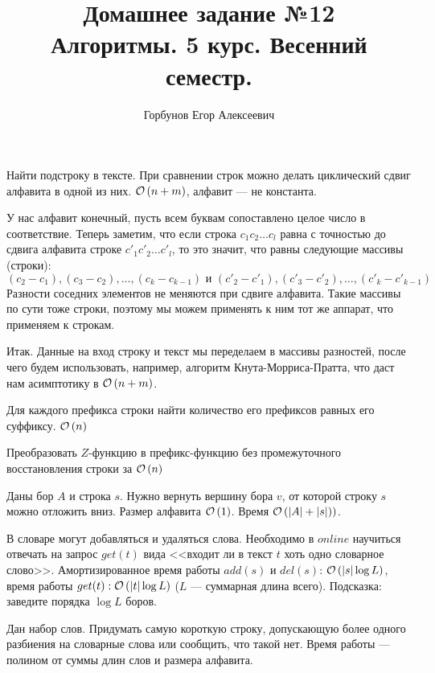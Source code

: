 

\title{Домашнее задание №12 \\ Алгоритмы. 5 курс. Весенний семестр.}
\author{Горбунов Егор Алексеевич}


\maketitle

\begin{task}[1]
Найти подстроку в тексте. При сравнении строк можно делать циклический сдвиг алфавита в одной из них. $\mathcal{O}\left(n + m\right)$, алфавит --- не константа.
\end{task}
\begin{solution}
У нас алфавит конечный, пусть всем буквам сопоставлено целое число в соответствие. Теперь заметим, что если строка $c_1c_2\ldots c_l$ равна с точностью до сдвига алфавита строке $c'_1c'_2\ldots c'_l$, то это значит, что равны следующие массивы (строки):
\[
	(c_2 - c_1), (c_3 - c_2), \ldots, (c_k - c_{k-1}) \text{ и } (c'_2 - c'_1), (c'_3 - c'_2), \ldots, (c'_k - c'_{k-1})
\]
Разности соседних элементов не меняются при сдвиге алфавита.
Такие массивы по сути тоже строки, поэтому мы можем применять к ним тот же аппарат, что применяем к строкам.

Итак. Данные на вход строку и текст мы переделаем в массивы разностей, после чего будем использовать, например, алгоритм Кнута-Морриса-Пратта, что даст нам асимптотику в $\mathcal{O}\left(n + m\right)$. 
\end{solution}


\begin{task}[2]
Для каждого префикса строки найти количество его префиксов равных его суффиксу. $\mathcal{O}\left(n\right)$
\end{task}


\begin{task}[3]
Преобразовать $Z$-функцию в префикс-функцию без промежуточного восстановления строки за $\mathcal{O}\left(n\right)$
\end{task}


\begin{task}[5]
Даны бор $A$ и строка $s$. Нужно вернуть вершину бора $v$, от которой строку $s$ можно отложить вниз. Размер алфавита $\mathcal{O}\left(1\right)$. Время $\mathcal{O}\left(|A|+|s|)\right)$.
\end{task}

\begin{task}[6]
В словаре могут добавляться и удаляться слова. Необходимо в $online$ научиться отвечать на запрос $get(t)$ вида <<входит ли в текст $t$ хоть одно словарное слово>>. Амортизированное время работы $add(s)$ и $del(s)$: $\mathcal{O}\left(|s|\log{L}\right)$, время работы $get(t): \mathcal{O}\left(|t|\log{L}\right)$ ($L$ --- суммарная длина всего). Подсказка: заведите порядка $\log{L}$ боров.
\end{task}


\begin{task}[7]
Дан набор слов. Придумать самую короткую строку, допускающую более одного разбиения на словарные слова или сообщить, что такой нет. Время работы --- полином от суммы длин слов и размера алфавита.
\end{task}


